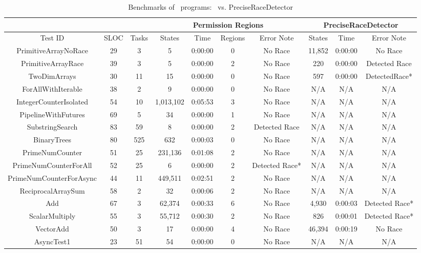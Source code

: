 \begin{table*}[h]
\centering
\caption{Benchmarks of \hj\ programs: \jpfhj\ vs. PreciseRaceDetector}
\label{tab:perf}
\begin{tabular}{|c|c|c|c|c|c|c|c|c|c|}
\hline
        &      &       & \multicolumn{4}{c|}{Permission Regions} &
\multicolumn{3}{c|}{PreciseRaceDetector} \\ \hline
Test ID & SLOC & Tasks & States  & Time  & Regions  & Error Note & States      &
Time      & Error Note     \\ \hline
PrimitiveArrayNoRace & 29 & 3 & 5 & 0:00:00 & 0 & No Race & 11,852 & 0:00:00 &
No Race \\ \hline
PrimitiveArrayRace & 39 & 3 & 5 & 0:00:00 & 2 & No Race & 220 & 0:00:00 &
Detected Race \\ \hline
TwoDimArrays & 30 & 11 & 15 & 0:00:00 & 0 & No Race & 597 & 0:00:00 &
DetectedRace* \\ \hline
ForAllWithIterable & 38 &  2 & 9 & 0:00:00 & 0 & No Race & N/A & N/A & N/A
\\ \hline
IntegerCounterIsolated  & 54 & 10 & 1,013,102 & 0:05:53 & 3 & No Race & N/A & N/A 
& N/A \\ \hline
PipelineWithFutures & 69 & 5 & 34 & 0:00:00 & 1 & No Race & N/A & N/A & N/A
\\ \hline
SubstringSearch & 83 & 59 & 8 & 0:00:00 & 2 & Detected Race & N/A & N/A & N/A
\\ \hline
BinaryTrees & 80 & 525 & 632 & 0:00:03 & 0 & No Race & N/A & N/A & N/A
\\ \hline
PrimeNumCounter & 51 & 25 & 231,136 & 0:01:08 & 2 & No Race & N/A & N/A & N/A
\\ \hline
PrimeNumCounterForAll & 52 & 25 & 6 & 0:00:00 & 2 & Detected Race* & N/A & N/A & N/A
\\ \hline
PrimeNumCounterForAsync & 44 & 11 & 449,511 & 0:02:51 & 2 & No Race & N/A & N/A
& N/A \\ \hline
ReciprocalArraySum & 58 & 2 & 32 & 0:00:06 & 2 & No Race & N/A & N/A & N/A
\\ \hline
Add & 67 & 3 & 62,374 & 0:00:33 & 6 & No Race & 4,930 & 0:00:03 & Detected Race*
\\ \hline
ScalarMultiply & 55 & 3 & 55,712 & 0:00:30 & 2 & No Race & 826 & 0:00:01 & Detected Race*
\\ \hline
VectorAdd & 50 & 3 & 17 & 0:00:00 & 4 & No Race & 46,394 & 0:00:19 & No Race
\\ \hline
AsyncTest1 & 23 & 51 & 54 & 0:00:00 & 0 & No Race & N/A & N/A & N/A
\\ \hline

\end{tabular}
\end{table*}
